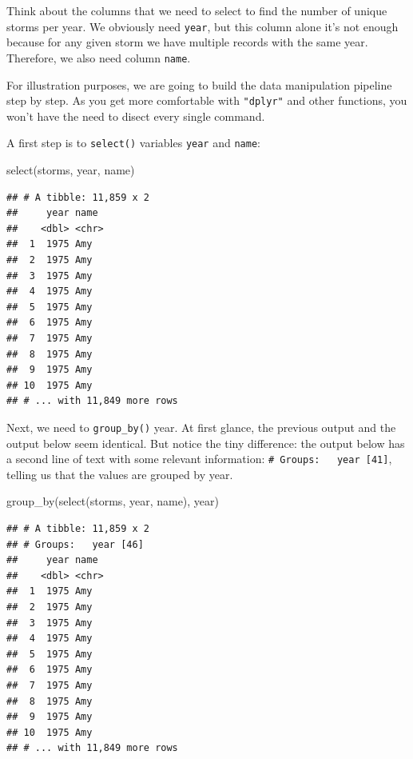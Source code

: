 \documentclass[
]{book}
\newenvironment{Shaded}{\begin{snugshade}}{\end{snugshade}}
\newcommand{\FunctionTok}[1]{\textcolor[rgb]{0.00,0.00,0.00}{#1}}
\newcommand{\NormalTok}[1]{#1}
\begin{document}
Think about the columns that we need to select to find the number of unique
storms per year. We obviously need \texttt{year}, but this column alone it's not enough
because for any given storm we have multiple records with the same year.
Therefore, we also need column \texttt{name}.

For illustration purposes, we are going to build the data manipulation pipeline
step by step. As you get more comfortable with \texttt{"dplyr"} and other functions,
you won't have the need to disect every single command.

A first step is to \texttt{select()} variables \texttt{year} and \texttt{name}:

\begin{Shaded}
\begin{Highlighting}[]
\FunctionTok{select}\NormalTok{(storms, year, name)}
\end{Highlighting}
\end{Shaded}

\begin{verbatim}
## # A tibble: 11,859 x 2
##     year name 
##    <dbl> <chr>
##  1  1975 Amy  
##  2  1975 Amy  
##  3  1975 Amy  
##  4  1975 Amy  
##  5  1975 Amy  
##  6  1975 Amy  
##  7  1975 Amy  
##  8  1975 Amy  
##  9  1975 Amy  
## 10  1975 Amy  
## # ... with 11,849 more rows
\end{verbatim}

Next, we need to \texttt{group\_by()} year. At first glance, the previous output and
the output below seem identical. But notice the tiny difference: the output
below has a second line of text with some relevant information:
\texttt{\#\ Groups:\ \ \ year\ {[}41{]}}, telling us that the values are grouped by year.

\begin{Shaded}
\begin{Highlighting}[]
\FunctionTok{group\_by}\NormalTok{(}\FunctionTok{select}\NormalTok{(storms, year, name), year)}
\end{Highlighting}
\end{Shaded}

\begin{verbatim}
## # A tibble: 11,859 x 2
## # Groups:   year [46]
##     year name 
##    <dbl> <chr>
##  1  1975 Amy  
##  2  1975 Amy  
##  3  1975 Amy  
##  4  1975 Amy  
##  5  1975 Amy  
##  6  1975 Amy  
##  7  1975 Amy  
##  8  1975 Amy  
##  9  1975 Amy  
## 10  1975 Amy  
## # ... with 11,849 more rows
\end{verbatim}
\end{document}
